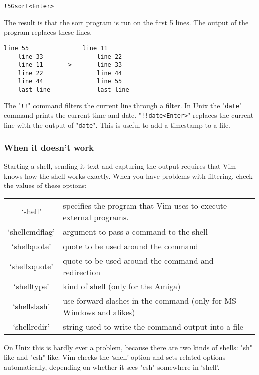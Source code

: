 \begin{Verbatim}[samepage=true]
 !5Gsort<Enter>
\end{Verbatim}

The result is that the sort program is run on the first 5 lines.
The output of the program replaces these lines.

\begin{Verbatim}[samepage=true]
    line 55               line 11
    line 33               line 22
    line 11     -->       line 33
    line 22               line 44
    line 44               line 55
    last line             last line
\end{Verbatim}

The "\verb:!!:" command filters the current line through a filter.
In Unix the "\verb!date!" command prints the current time and date.
"\verb:!!date<Enter>:" replaces the current line with the output of "\verb!date!".
This is useful to add a timestamp to a file.

\subsubsection{When it doesn't work}
Starting a shell, sending it text and capturing the output requires that Vim knows how the shell works exactly.
When you have problems with filtering, check the values of these options:

\begin{center}\begin{longtable}{c l}
				`shell' & specifies the program that Vim uses to execute external programs. \\
				`shellcmdflag' & argument to pass a command to the shell \\
				`shellquote' & quote to be used around the command \\
				`shellxquote' & quote to be used around the command and redirection \\
				`shelltype' & kind of shell (only for the Amiga) \\
				`shellslash' & use forward slashes in the command (only for MS-Windows and alikes) \\
				`shellredir' & string used to write the command output into a file \\
\end{longtable}\end{center}

On Unix this is hardly ever a problem, because there are two kinds of shells: "sh" like and "csh" like.
Vim checks the `shell' option and sets related options automatically, depending on whether it sees "csh" somewhere in `shell'.

